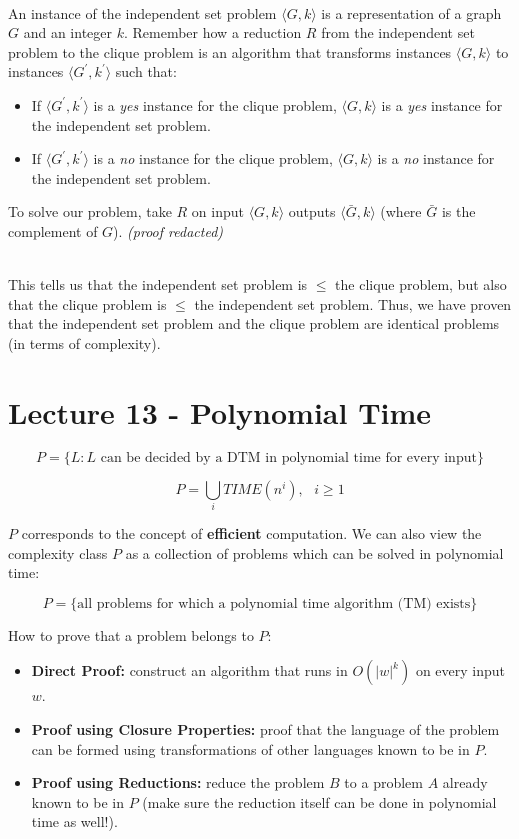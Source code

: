 \documentclass[12pt]{article}
\begin{document}
\noindent
\\
An instance of the independent set problem $\langle G, k \rangle$ is a representation of a graph $G$ and an integer $k$.
Remember how a reduction $R$ from the independent set problem to the clique problem is an algorithm that transforms instances $\langle G, k \rangle$ to instances $\langle G^\prime, k^\prime \rangle$ such that:

\begin{itemize}
    \item If $\langle G^\prime, k^\prime \rangle$ is a \textit{yes} instance for the clique problem, $\langle G, k \rangle$ is a \textit{yes} instance for the independent set problem.
    \item If $\langle G^\prime, k^\prime \rangle$ is a \textit{no} instance for the clique problem, $\langle G, k \rangle$ is a \textit{no} instance for the independent set problem.
\end{itemize}

\noindent
To solve our problem, take $R$ on input $\langle G, k \rangle$ outputs $\langle \bar{G}, k \rangle$ (where $\bar{G}$ is the complement of $G$).
\textit{(proof redacted)}

\noindent
\\
This tells us that the independent set problem is $\leq$ the clique problem, but also that the clique problem is $\leq$ the independent set problem.
Thus, we have proven that the independent set problem and the clique problem are identical problems (in terms of complexity).

%
%
\newpage
\section*{Lecture 13 - Polynomial Time}
\[ P = \{L : L \text{ can be decided by a DTM in polynomial time for every input}\} \]

\[ P = \bigcup_i TIME(n^i), \text{  } i \geq 1 \]

\noindent
$P$ corresponds to the concept of \textbf{efficient} computation.
We can also view the complexity class $P$ as a collection of problems which can be solved in polynomial time:

\[ P = \{\text{all problems for which a polynomial time algorithm (TM) exists}\} \]

\noindent
How to prove that a problem belongs to $P$:

\begin{itemize}
    \item \textbf{Direct Proof:} construct an algorithm that runs in $O(|w|^k)$ on every input $w$.
    \item \textbf{Proof using Closure Properties:} proof that the language of the problem can be formed using transformations of other languages known to be in $P$.
    \item \textbf{Proof using Reductions:} reduce the problem $B$ to a problem $A$ already known to be in $P$ (make sure the reduction itself can be done in polynomial time as well!).
\end{itemize}
\end{document}
